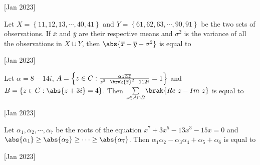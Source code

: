     \hfill{[Jan 2023]}
        
    \item Let $X=\left\{ 11,12,13,\cdots,40,41\right\}$ and $Y=\left\{61,62,63,\cdots,90,91\right\}$ be the two sets of observations. If $\overline{x}$ and $\overline{y}$ are their respective means and $\sigma^2$ is the variance  of all the observations in $X\cup Y$, then $\abs{\overline{x}+\overline{y}-\sigma^2}$ is equal to
    
    \hfill{[Jan 2023]}

    \item Let $\alpha =8-14i$, $A=\left\{z\in C:\frac{\alpha z\overline{\alpha}\overline{z}}{z^2-\brak{\overline{z}}^2-112i}=1\right\}$ and $B=\left\{z\in C:\abs{z+3i}=4\right\}$. Then $\underset{z\in A\cap B}{\sum}\brak{Re\ z-Im\ z}$ is equal to
    
    \hfill{[Jan 2023]}

    \item Let $\alpha_1,\alpha_2,\cdots,\alpha_7$ be the roots of the equation $x^7+3x^5-13x^3-15x=0$ and $\abs{\alpha_1}\geq\abs{\alpha_2}\geq\cdots\geq\abs{\alpha_7}$. Then $\alpha_1\alpha_2-\alpha_3\alpha_4+\alpha_5+\alpha_6$ is equal to
    
    \hfill{[Jan 2023]}
